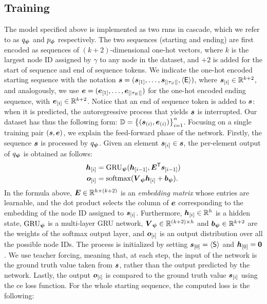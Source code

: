 \subsection{Training}
The model specified above is implemented as two \glspl{rnn} in cascade, which we refer to as $q_{\boldsymbol{\psi}}$ and $p_{\boldsymbol{\phi}}$ respectively. The two sequences (starting and ending) are first encoded as sequences of $(k+2)$-dimensional one-hot vectors, where $k$ is the largest node ID assigned by $\gamma$ to any node in the dataset, and $+2$ is added for the start of sequence and end of sequence tokens. We indicate the one-hot encoded starting sequence with the notation $\Vector{s} = (\Elem{s}{1}, \ldots, \Elem{s}{|\tau_S|}, \EOS)$, where $\Elem{s}{i} \in \Real^{k+2}$, and analogously, we use $\Vector{e} = (\Elem{e}{1}, \ldots, \Elem{e}{|\tau_E|})$ for the one-hot encoded ending sequence, with $\Elem{e}{i} \in \Real^{k+2}$. Notice that an end of sequence token is added to $\Vector{s}$: when it is predicted, the autoregressive process that yields $\Vector{s}$ is interrupted. Our dataset has thus the following form: $\Data = \Set{(\Vector{s}_{(i)}, \Vector{e}_{(i)})}_{i=1}^n$. Focusing on a single training pair $(\Vector{s}, \Vector{e})$, we explain the feed-forward phase of the network. Firstly, the sequence $\Vector{s}$ is processed by $q_{\boldsymbol{\psi}}$. Given an element $\Elem{s}{i} \in \Vector{s}$, the per-element output of $q_{\boldsymbol{\psi}}$ is obtained as follows:
\begin{align*}
    \Elem{h}{i} &= \Op{GRU}_{\EncParam}(\Elem{h}{i-1}, \Matrix{E}^{\Transpose}\Elem{s}{i-1})\\
    \Elem{o}{i} &= \softmax(\Matrix{V}_{\EncParam}\Elem{h}{i} + \Vector{b}_{\EncParam}).
\end{align*}
In the formula above, $\Matrix{E} \in \Real^{h \times (k+2)}$ is an \emph{embedding matrix} whose entries are learnable, and the dot product selects the column of $\Vector{E}$ corresponding to the embedding of the node ID assigned to $\Elem{s}{i}$. Furthermore, $\Elem{h}{i} \in \Real^h$ is a hidden state, $\operatorname{GRU}_{\boldsymbol{\psi}}$ is a multi-layer GRU network, $\Matrix{V}_{\EncParam} \in \Real^{(k+2)\times h}$ and $\Vector{b}_{\EncParam} \in \Real^{k+2}$ are the weights of the softmax output layer, and $\Elem{o}{i}$ is an output distribution over all the possible node IDs. The process is initialized by setting $\Elem{s}{0} = \SOS$ and $\Elem{h}{0} = \Zeros$. We use teacher forcing, meaning that, at each step, the input of the network is the ground truth value taken from $\Vector{s}$, rather than the output predicted by the network. Lastly, the output $\Elem{o}{i}$ is compared to the ground truth value $\Elem{s}{i}$ using the \gls{ce} loss function. For the whole starting sequence, the computed loss is the following:
